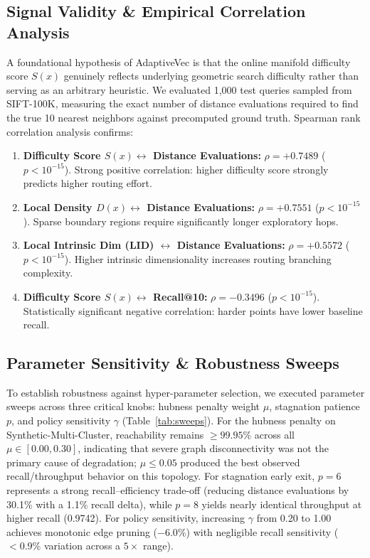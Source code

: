 \documentclass[conference,10pt]{IEEEtran}
\begin{document}
\subsection{Signal Validity \& Empirical Correlation Analysis}
A foundational hypothesis of AdaptiveVec is that the online manifold difficulty score $S(x)$ genuinely reflects underlying geometric search difficulty rather than serving as an arbitrary heuristic. We evaluated 1,000 test queries sampled from SIFT-100K, measuring the exact number of distance evaluations required to find the true 10 nearest neighbors against precomputed ground truth. Spearman rank correlation analysis confirms:
\begin{enumerate}
    \item \textbf{Difficulty Score $S(x) \leftrightarrow$ Distance Evaluations:} $\rho = \mathbf{+0.7489}$ ($p < 10^{-15}$). Strong positive correlation: higher difficulty score strongly predicts higher routing effort.
    \item \textbf{Local Density $D(x) \leftrightarrow$ Distance Evaluations:} $\rho = \mathbf{+0.7551}$ ($p < 10^{-15}$). Sparse boundary regions require significantly longer exploratory hops.
    \item \textbf{Local Intrinsic Dim (LID) $\leftrightarrow$ Distance Evaluations:} $\rho = \mathbf{+0.5572}$ ($p < 10^{-15}$). Higher intrinsic dimensionality increases routing branching complexity.
    \item \textbf{Difficulty Score $S(x) \leftrightarrow$ Recall@10:} $\rho = \mathbf{-0.3496}$ ($p < 10^{-15}$). Statistically significant negative correlation: harder points have lower baseline recall.
\end{enumerate}

\subsection{Parameter Sensitivity \& Robustness Sweeps}
To establish robustness against hyper-parameter selection, we executed parameter sweeps across three critical knobs: hubness penalty weight $\mu$, stagnation patience $p$, and policy sensitivity $\gamma$ (Table~\ref{tab:sweeps}). For the hubness penalty on Synthetic-Multi-Cluster, reachability remains $\ge 99.95\%$ across all $\mu \in [0.00, 0.30]$, indicating that severe graph disconnectivity was not the primary cause of degradation; $\mu \le 0.05$ produced the best observed recall/throughput behavior on this topology. For stagnation early exit, $p=6$ represents a strong recall--efficiency trade-off (reducing distance evaluations by 30.1\% with a 1.1\% recall delta), while $p=8$ yields nearly identical throughput at higher recall (0.9742). For policy sensitivity, increasing $\gamma$ from 0.20 to 1.00 achieves monotonic edge pruning ($-6.0\%$) with negligible recall sensitivity ($<0.9\%$ variation across a $5\times$ range).
\end{document}
